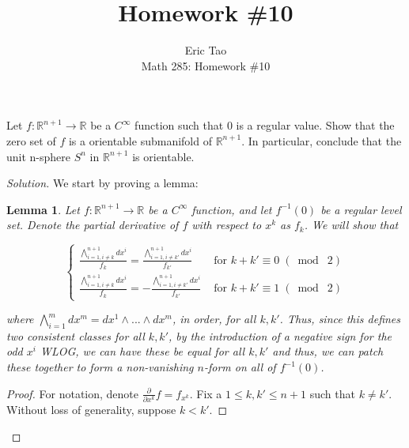 \documentclass[10pt]{article}
\theoremstyle{nonumberplain}%
\newtheorem*{lemma}{Lemma}
\newenvironment{problem}[2][]{\begin{trivlist}
\item[\hskip \labelsep {\bfseries #1}\hskip \labelsep {\bfseries #2.}]}{\end{trivlist}}
\begin{document}
 
\title{Homework \#10}
\author{Eric Tao\\
Math 285: Homework \#10}
\maketitle

\begin{problem}{Question 1}

Let $f: \mathbb{R}^{n+1} \to \mathbb{R}$ be a $C^\infty$ function such that $0$ is a regular value. Show that the zero set of $f$ is a orientable submanifold of $\mathbb{R}^{n+1}$. In particular, conclude that the unit n-sphere $S^n$ in $\mathbb{R}^{n+1}$ is orientable.

\end{problem}

\begin{proof}[Solution]

We start by proving a lemma:

\begin{lemma}

Let $f: \mathbb{R}^{n+1} \to \mathbb{R}$ be a $C^\infty$ function, and let $f^{-1}(0)$ be a regular level set. Denote the partial derivative of $f$ with respect to $x^k$ as $f_k$. We will show that 

$$\begin{cases} \frac{\bigwedge_{i=1, i \not = k}^{n+1} dx^i}{ f_k} = \frac{\bigwedge_{i=1, i \not = k'}^{n+1} dx^i}{ f_{k'}} & \text{ for } k + k' \equiv 0 \; (\bmod \; 2)  \\ \frac{\bigwedge_{i=1, i \not = k}^{n+1} dx^i}{f_k} = -\frac{\bigwedge_{i=1, i \not = k'}^{n+1} dx^i}{  f_{k'}} & \text{ for } k + k' \equiv 1  \; (\bmod \; 2) \end{cases} $$

where $\bigwedge_{i=1}^m dx^m = dx^1 \wedge ... \wedge dx^m$, in order, for all $k, k'$. Thus, since this defines two consistent classes for all $k, k'$, by the introduction of a negative sign for the odd $x^i$ WLOG, we can have these be equal for all $k, k'$ and thus, we can patch these together to form a non-vanishing $n$-form on all of $f^{-1}(0)$.

\end{lemma}

\begin{proof}

For notation, denote $ \frac{\partial}{\partial x^k} f = f_{x^k}$. Fix a $1 \leq k, k' \leq n+1$ such that $k \not = k'$. Without loss of generality, suppose $k < k'$.


\end{proof}
\end{proof}
\end{document}
